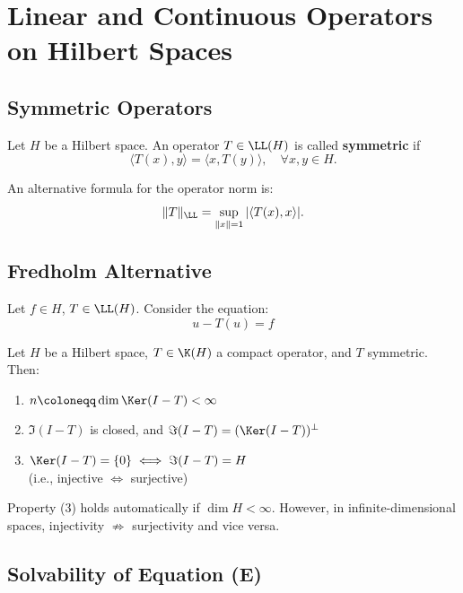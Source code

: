\section{Linear and Continuous Operators on Hilbert Spaces}

\subsection{Symmetric Operators}

\begin{definition}
Let $H$ be a Hilbert space. An operator $T \in \LL(H)$ is called \textbf{symmetric} if
\[
\langle T(x), y \rangle = \langle x, T(y) \rangle, \quad \forall x, y \in H.
\]
\end{definition}

\begin{remark}
An alternative formula for the operator norm is:
\[
\|T\|_\LL = \sup_{\|x\| = 1} |\langle T(x), x \rangle|.
\]
\end{remark}

\subsection{Fredholm Alternative}

Let $f \in H$, $T \in \LL(H)$. Consider the equation:
\[
u - T(u) = f \tag{E}
\]

\begin{theorem}
Let $H$ be a Hilbert space, $T \in \K(H)$ a compact operator, and $T$ symmetric. Then:
\begin{enumerate}
\item $n \coloneqq \dim \Ker(I - T) < \infty$
\item $\Im(I - T)$ is closed, and $\Im(I - T) = (\Ker(I - T))^\perp$
\item $\Ker(I - T) = \{0\} \iff \Im(I - T) = H$ \\
      (i.e., injective $\iff$ surjective)
\end{enumerate}
\end{theorem}

\begin{remark}
Property (3) holds automatically if $\dim H < \infty$. However, in infinite-dimensional spaces, injectivity $\not\Rightarrow$ surjectivity and vice versa.
\end{remark}

\subsection{Solvability of Equation (E)}

